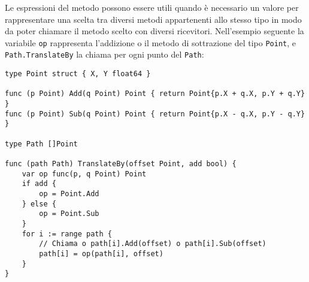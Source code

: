 \documentclass[../../thesis.tex]{subfiles}
\begin{document}
    Le espressioni del metodo possono essere utili quando è necessario un valore per rappresentare una scelta tra diversi metodi appartenenti allo stesso tipo in modo da poter chiamare il metodo scelto con diversi ricevitori.
    Nell'esempio seguente la variabile \verb"op" rappresenta l'addizione o il metodo di sottrazione del tipo \verb"Point", e \verb"Path.TranslateBy" la chiama per ogni punto del \verb"Path":
    \begin{lstlisting}[frame = single, label = {lst:lstlisting5-4.5}]
type Point struct { X, Y float64 }

func (p Point) Add(q Point) Point { return Point{p.X + q.X, p.Y + q.Y} }
func (p Point) Sub(q Point) Point { return Point{p.X - q.X, p.Y - q.Y} }

type Path []Point

func (path Path) TranslateBy(offset Point, add bool) {
    var op func(p, q Point) Point
    if add {
        op = Point.Add
    } else {
        op = Point.Sub
    }
    for i := range path {
        // Chiama o path[i].Add(offset) o path[i].Sub(offset)
        path[i] = op(path[i], offset)
    }
}
    \end{lstlisting}
\end{document}
